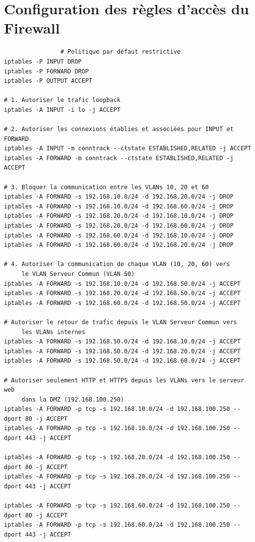 \documentclass[a4paper,12pt,openany]{report}
\begin{document}
            \section{Configuration des règles d'accès du Firewall}
            \begin{verbatim}
                # Politique par défaut restrictive
iptables -P INPUT DROP
iptables -P FORWARD DROP
iptables -P OUTPUT ACCEPT

# 1. Autoriser le trafic loopback
iptables -A INPUT -i lo -j ACCEPT

# 2. Autoriser les connexions établies et associées pour INPUT et FORWARD
iptables -A INPUT -m conntrack --ctstate ESTABLISHED,RELATED -j ACCEPT
iptables -A FORWARD -m conntrack --ctstate ESTABLISHED,RELATED -j ACCEPT

# 3. Bloquer la communication entre les VLANs 10, 20 et 60
iptables -A FORWARD -s 192.168.10.0/24 -d 192.168.20.0/24 -j DROP
iptables -A FORWARD -s 192.168.10.0/24 -d 192.168.60.0/24 -j DROP
iptables -A FORWARD -s 192.168.20.0/24 -d 192.168.10.0/24 -j DROP
iptables -A FORWARD -s 192.168.20.0/24 -d 192.168.60.0/24 -j DROP
iptables -A FORWARD -s 192.168.60.0/24 -d 192.168.10.0/24 -j DROP
iptables -A FORWARD -s 192.168.60.0/24 -d 192.168.20.0/24 -j DROP

# 4. Autoriser la communication de chaque VLAN (10, 20, 60) vers
     le VLAN Serveur Commun (VLAN 50)
iptables -A FORWARD -s 192.168.10.0/24 -d 192.168.50.0/24 -j ACCEPT
iptables -A FORWARD -s 192.168.20.0/24 -d 192.168.50.0/24 -j ACCEPT
iptables -A FORWARD -s 192.168.60.0/24 -d 192.168.50.0/24 -j ACCEPT

# Autoriser le retour de trafic depuis le VLAN Serveur Commun vers
     les VLANs internes
iptables -A FORWARD -s 192.168.50.0/24 -d 192.168.10.0/24 -j ACCEPT
iptables -A FORWARD -s 192.168.50.0/24 -d 192.168.20.0/24 -j ACCEPT
iptables -A FORWARD -s 192.168.50.0/24 -d 192.168.60.0/24 -j ACCEPT

# Autoriser seulement HTTP et HTTPS depuis les VLANs vers le serveur web
     dans la DMZ (192.168.100.250)
iptables -A FORWARD -p tcp -s 192.168.10.0/24 -d 192.168.100.250 --dport 80 -j ACCEPT
iptables -A FORWARD -p tcp -s 192.168.10.0/24 -d 192.168.100.250 --dport 443 -j ACCEPT

iptables -A FORWARD -p tcp -s 192.168.20.0/24 -d 192.168.100.250 --dport 80 -j ACCEPT
iptables -A FORWARD -p tcp -s 192.168.20.0/24 -d 192.168.100.250 --dport 443 -j ACCEPT

iptables -A FORWARD -p tcp -s 192.168.60.0/24 -d 192.168.100.250 --dport 80 -j ACCEPT
iptables -A FORWARD -p tcp -s 192.168.60.0/24 -d 192.168.100.250 --dport 443 -j ACCEPT


\end{verbatim}
\end{document}
